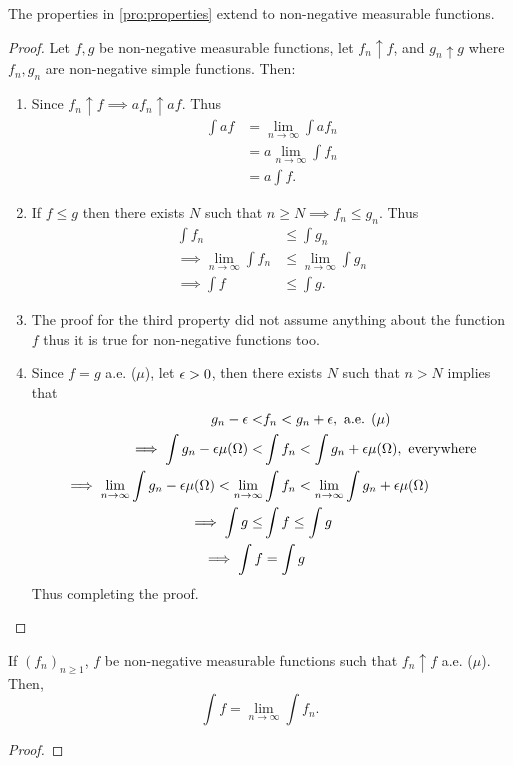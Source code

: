 \begin{proposition}
  The properties in \cref{pro:properties} extend to non-negative measurable functions. 
\end{proposition}
\begin{proof}
  Let $f,g$ be non-negative measurable functions, let $f_n \uparrow f$, and $g_n \uparrow g$ where $f_n, g_n$ are non-negative simple functions. Then:
  \begin{enumerate}
    \item Since $f_n \uparrow f \implies af_n \uparrow af$. Thus
      \begin{align*}
        \int a f &= \lim_{n\to\infty} \int a f_n\\
                 &= a\lim_{n\to\infty} \int f_n\\
                 &= a \int f.
      \end{align*}
    \item If $f\leq g$ then there exists $N$ such that $n\geq N \implies f_n \leq g_n$. Thus
      \begin{align*}
        \int f_n &\leq \int g_n\\
        \implies \lim_{n\to\infty} \int f_n &\leq\lim_{n\to\infty} \int g_n\\
        \implies \int f &\leq \int g.
      \end{align*}
    \item The proof for the third property did not assume anything about the function $f$ thus it is true for non-negative functions too.
    \item Since $f = g$ a.e. ($\mu$), let $\epsilon >0$, then there exists $N$ such that $n>N$ implies that
      \begin{align*}
        g_n - \epsilon < &f_n < g_n + \epsilon,\ \text{a.e. ($\mu$)}\\
        \implies \int g_n - \epsilon \mu(\Omega) < &\int f_n < \int g_n + \epsilon \mu(\Omega),\ \text{everywhere}\\
        \implies \lim_{n\to\infty} \int g_n - \epsilon \mu(\Omega) <\lim_{n\to\infty} &\int f_n <\lim_{n\to\infty} \int g_n +\epsilon \mu(\Omega)\\
        \implies \int g \leq &\int f \leq \int g\\
        \implies \int f &= \int g
      \end{align*}
      Thus completing the proof.
  \end{enumerate}
\end{proof}
\begin{theorem}
  If $(f_n)_{n\geq 1}$, $f$ be non-negative measurable functions such that $f_n \uparrow f$ a.e. ($\mu$). Then,
  \[\int f =\lim_{n\to\infty} \int f_n.\]
\end{theorem}
\begin{proof}
  
\end{proof}
